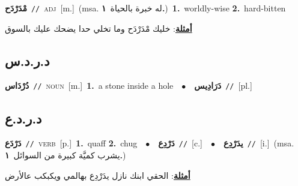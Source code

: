 \documentclass[10pt,a4paper,twoside]{article} %
\begin{document}
\begin{multicols}{2}
{\setlength\topsep{0pt}\textbf{\foreignlanguage{arabic}{مْدَرْدَح}}\ {\color{gray}\texttt{//}\color{black}}\ \textsc{adj}\ [m.]\ \color{gray}(msa. \foreignlanguage{arabic}{له خبرة بالحياة}~\foreignlanguage{arabic}{\textbf{١.}})\color{black}\ \textbf{1.}~worldly-wise  \textbf{2.}~hard-bitten\  \begin{flushright}\color{gray}\foreignlanguage{arabic}{\textbf{\underline{\foreignlanguage{arabic}{أمثلة}}}: خليك مْدَرْدَح وما تخلي حدا يضحك عليك بالسوق}\end{flushright}\color{black}} \vspace{2mm}

\vspace{-3mm}
\subsection*{\color{blue}\foreignlanguage{arabic}{د.ر.د.س}\color{blue}{}} 

{\setlength\topsep{0pt}\textbf{\foreignlanguage{arabic}{دُرْدَاس}}\ {\color{gray}\texttt{//}\color{black}}\ \textsc{noun}\ [m.]\ \textbf{1.}~a stone inside a hole\ \ $\bullet$\ \ \setlength\topsep{0pt}\textbf{\foreignlanguage{arabic}{دَرَادِيس}}\ {\color{gray}\texttt{//}\color{black}}\ [pl.]\ } \vspace{2mm}

\vspace{-3mm}
\subsection*{\color{blue}\foreignlanguage{arabic}{د.ر.د.ع}\color{blue}{}} 

{\setlength\topsep{0pt}\textbf{\foreignlanguage{arabic}{دَرْدَع}}\ {\color{gray}\texttt{//}\color{black}}\ \textsc{verb}\ [p.]\ \textbf{1.}~quaff  \textbf{2.}~chug\ \ $\bullet$\ \ \setlength\topsep{0pt}\textbf{\foreignlanguage{arabic}{دَرْدِع}}\ {\color{gray}\texttt{//}\color{black}}\ [c.]\ \ $\bullet$\ \ \setlength\topsep{0pt}\textbf{\foreignlanguage{arabic}{يدَرْدِع}}\ {\color{gray}\texttt{//}\color{black}}\ [i.]\ \color{gray}(msa. \foreignlanguage{arabic}{يشرب كميَّة كبيرة من السوائل}~\foreignlanguage{arabic}{\textbf{١.}})\color{black}\  \begin{flushright}\color{gray}\foreignlanguage{arabic}{\textbf{\underline{\foreignlanguage{arabic}{أمثلة}}}: الحقي ابنك نازل يدَرْدِع بهالمي ويكبكب عالأرض}\end{flushright}\color{black}} \vspace{2mm}


\end{multicols}
\end{document}
